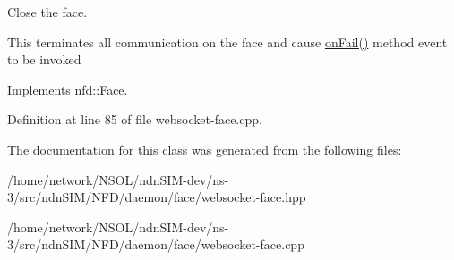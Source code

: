 Close the face. 

This terminates all communication on the face and cause \hyperlink{classnfd_1_1Face_a0f6ac85e5c965d24290f87562022123f}{on\+Fail()} method event to be invoked 

Implements \hyperlink{classnfd_1_1Face_a63f2c417cde23bf09441927951ef86d3}{nfd\+::\+Face}.



Definition at line 85 of file websocket-\/face.\+cpp.



The documentation for this class was generated from the following files\+:\begin{DoxyCompactItemize}
\item 
/home/network/\+N\+S\+O\+L/ndn\+S\+I\+M-\/dev/ns-\/3/src/ndn\+S\+I\+M/\+N\+F\+D/daemon/face/websocket-\/face.\+hpp\item 
/home/network/\+N\+S\+O\+L/ndn\+S\+I\+M-\/dev/ns-\/3/src/ndn\+S\+I\+M/\+N\+F\+D/daemon/face/websocket-\/face.\+cpp\end{DoxyCompactItemize}
